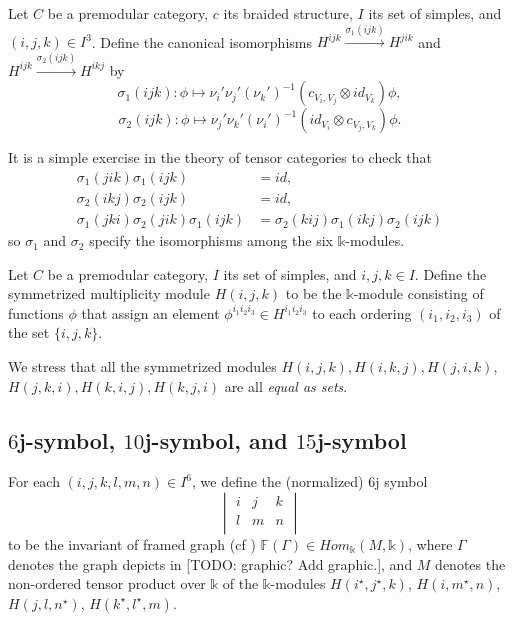 \begin{definition}\label{def/canonical-isomorphism}
  Let $C$ be a premodular category, $c$ its braided structure,
  $I$ its set of simples, and $(i,j,k) \in I^{3}$. Define the
  canonical isomorphisms
  $H^{ijk} \xrightarrow{\sigma_{1}(ijk)} H^{jik}$ and
  $H^{ijk} \xrightarrow{\sigma_{2}(ijk)} H^{ikj}$ by
  $$\sigma_{1}(ijk): \phi \mapsto \nu_{i}'\nu_{j}'(\nu_{k}')^{-1}(c_{V_{i}, V_{j}} \otimes id_{V_{k}})\phi,$$
  $$\sigma_{2}(ijk): \phi \mapsto \nu_{j}'\nu_{k}'(\nu_{i}')^{-1}(id_{V_{i}} \otimes c_{V_{j}, V_{k}})\phi.$$
\end{definition}

\noindent It is a simple exercise in the theory of tensor
categories to check that
\begin{equation} \label{eq1}
  \begin{split}
    \sigma_{1}(jik)\sigma_{1}(ijk) & = id, \\
    \sigma_{2}(ikj)\sigma_{2}(ijk) & = id, \\
    \sigma_{1}(jki)\sigma_{2}(jik)\sigma_{1}(ijk) & = \sigma_{2}(kij)\sigma_{1}(ikj)\sigma_{2}(ijk)
  \end{split}
\end{equation}
so $\sigma_{1}$ and $\sigma_{2}$ specify the isomorphisms among
the six $\mathbb{k}$-modules.

\begin{definition}\label{def/symmetrized-multiplicity-module}
  Let $C$ be a premodular category, $I$ its set of simples, and
  $i, j, k \in I$. Define the symmetrized multiplicity module
  $H(i,j,k)$ to be the $\mathbb{k}$-module consisting of
  functions $\phi$ that assign an element
  $\phi^{i_{1}i_{2}i_{3}} \in H^{i_{1}i_{2}i_{3}}$ to each
  ordering $(i_{1}, i_{2}, i_{3})$ of the set $\{i, j, k\}$.
\end{definition}

\noindent We stress that all the symmetrized modules
$H(i,j,k), H(i,k,j), H(j,i,k)$, $H(j,k,i), H(k,i,j), H(k,j,i)$
are all \textit{equal as sets}.

\subsection{$6$j-symbol, $10$j-symbol, and $15$j-symbol}

\begin{definition}[$6$j-symbol]\label{def/6j-symbol}
  For each $(i,j,k,l,m,n) \in I^{6}$, we define the (normalized)
  $6$j symbol
  $$
  \begin{vmatrix}
    i & j & k  \\
    l & m & n  \\
  \end{vmatrix}
  $$
  to be the invariant of framed graph (cf \cite[section
  VI.4]{turaev-qiok-3-manifolds})
  $\mathbb{F}(\Gamma) \in Hom_{\mathbb{k}}(M, \mathbb{k})$, where
  $\Gamma$ denotes the graph depicts in [TODO: graphic? Add
  graphic.], and $M$ denotes the non-ordered tensor product over
  $\mathbb{k}$ of the $\mathbb{k}$-modules
  $H(i^{\star}, j^{\star}, k)$, $H(i, m^{\star}, n)$,
  $H(j, l, n^{\star})$, $H(k^{\star}, l^{\star}, m)$.
\end{definition}

